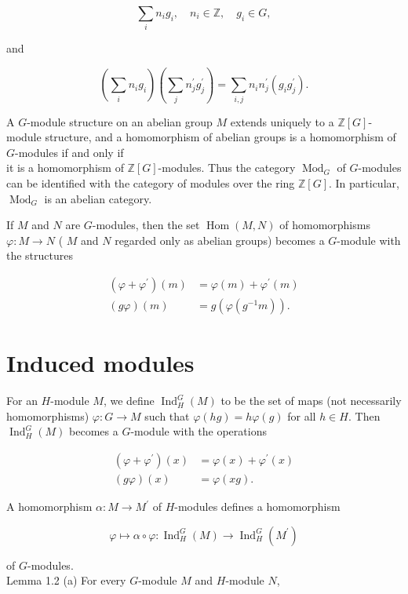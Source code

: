 \documentclass[10pt]{article}
\begin{document}
$$
\sum_{i} n_{i} g_{i}, \quad n_{i} \in \mathbb{Z}, \quad g_{i} \in G,
$$

and

$$
\left(\sum_{i} n_{i} g_{i}\right)\left(\sum_{j} n_{j}^{\prime} g_{j}^{\prime}\right)=\sum_{i, j} n_{i} n_{j}^{\prime}\left(g_{i} g_{j}^{\prime}\right) .
$$

A $G$-module structure on an abelian group $M$ extends uniquely to a $\mathbb{Z}[G]$-module structure, and a homomorphism of abelian groups is a homomorphism of $G$-modules if and only if\\
it is a homomorphism of $\mathbb{Z}[G]$-modules. Thus the category $\operatorname{Mod}_{G}$ of $G$-modules can be identified with the category of modules over the ring $\mathbb{Z}[G]$. In particular, $\operatorname{Mod}_{G}$ is an abelian category.

If $M$ and $N$ are $G$-modules, then the set $\operatorname{Hom}(M, N)$ of homomorphisms $\varphi: M \rightarrow N$ ( $M$ and $N$ regarded only as abelian groups) becomes a $G$-module with the structures


\begin{align*}
\left(\varphi+\varphi^{\prime}\right)(m) & =\varphi(m)+\varphi^{\prime}(m) \\
(g \varphi)(m) & =g\left(\varphi\left(g^{-1} m\right)\right) . \tag{11}
\end{align*}


\section*{Induced modules}
For an $H$-module $M$, we define $\operatorname{Ind}_{H}^{G}(M)$ to be the set of maps (not necessarily homomorphisms) $\varphi: G \rightarrow M$ such that $\varphi(h g)=h \varphi(g)$ for all $h \in H$. Then $\operatorname{Ind}_{H}^{G}(M)$ becomes a $G$-module with the operations


\begin{align*}
\left(\varphi+\varphi^{\prime}\right)(x) & =\varphi(x)+\varphi^{\prime}(x) \\
(g \varphi)(x) & =\varphi(x g) . \tag{12}
\end{align*}


A homomorphism $\alpha: M \rightarrow M^{\prime}$ of $H$-modules defines a homomorphism

$$
\varphi \mapsto \alpha \circ \varphi: \operatorname{Ind}_{H}^{G}(M) \rightarrow \operatorname{Ind}_{H}^{G}\left(M^{\prime}\right)
$$

of $G$-modules.\\
Lemma 1.2 (a) For every $G$-module $M$ and $H$-module $N$,
\end{document}
